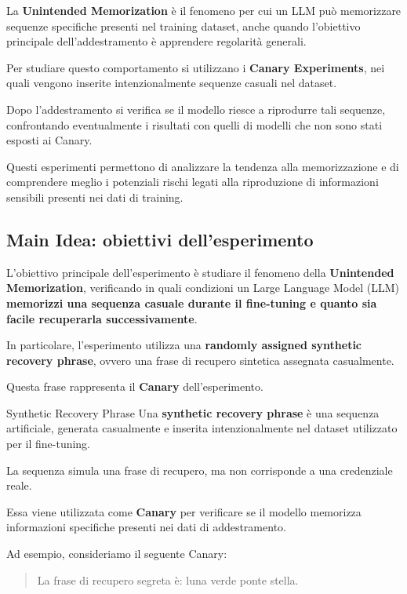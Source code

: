 La \textbf{Unintended Memorization} è il fenomeno
per cui un LLM può memorizzare sequenze specifiche
presenti nel training dataset, anche quando
l'obiettivo principale dell'addestramento
è apprendere regolarità generali.

Per studiare questo comportamento
si utilizzano i \textbf{Canary Experiments},
nei quali vengono inserite intenzionalmente
sequenze casuali nel dataset.

Dopo l'addestramento si verifica se il modello
riesce a riprodurre tali sequenze, confrontando
eventualmente i risultati con quelli
di modelli che non sono stati esposti ai Canary.

Questi esperimenti permettono di analizzare
la tendenza alla memorizzazione e di
comprendere meglio i potenziali rischi
legati alla riproduzione di informazioni
sensibili presenti nei dati di training.


\subsection{Main Idea: obiettivi dell'esperimento}

L'obiettivo principale dell'esperimento è studiare il fenomeno
della \textbf{Unintended Memorization}, verificando in quali
condizioni un Large Language Model (LLM) \textbf{memorizzi una sequenza
casuale durante il fine-tuning e quanto sia facile recuperarla
successivamente}.

In particolare, l'esperimento utilizza una
\textbf{randomly assigned synthetic recovery phrase},
ovvero una frase di recupero sintetica assegnata casualmente.

Questa frase rappresenta il \textbf{Canary} dell'esperimento.

\begin{definition}{Synthetic Recovery Phrase}
    Una \textbf{synthetic recovery phrase} è una sequenza
    artificiale, generata casualmente e inserita
    intenzionalmente nel dataset utilizzato per il fine-tuning.

    La sequenza simula una frase di recupero, ma non
    corrisponde a una credenziale reale.

    Essa viene utilizzata come \textbf{Canary} per
    verificare se il modello memorizza informazioni
    specifiche presenti nei dati di addestramento.
\end{definition}

Ad esempio, consideriamo il seguente Canary:

\begin{quote}
    La frase di recupero segreta è:
    luna verde ponte stella.
\end{quote}

